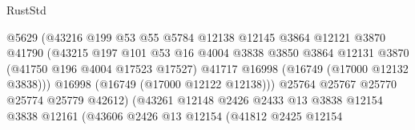 \begin{lexlean}{RustStd}
\begin{coremodule}
                                          @5629
                                          (@43216
                                            @199
                                            @53
                                            @55
                                            @5784
                                            @12138
                                            @12145
                                            @3864
                                            @12121
                                            @3870
                                            @41790
                                            (@43215
                                              @197
                                              @101
                                              @53
                                              @16
                                              @4004
                                              @3838
                                              @3850
                                              @3864
                                              @12131
                                              @3870
                                              (@41750 @196 @4004 @17523 @17527)
                                              @41717
                                              @16998
                                              (@16749 (@17000 @12132 @3838)))
                                            @16998
                                            (@16749 (@17000 @12122 @12138)))
                                          @25764
                                          @25767
                                          @25770
                                          @25774
                                          @25779
                                          @42612)
                                        (@43261
                                          @12148
                                          @2426
                                          @2433
                                          @13
                                          @3838
                                          @12154
                                          @3838
                                          @12161
                                          (@43606
                                            @2426
                                            @13
                                            @12154
                                            (@41812
                                              @2425
                                              @12154

\end{coremodule}
\end{lexlean}
